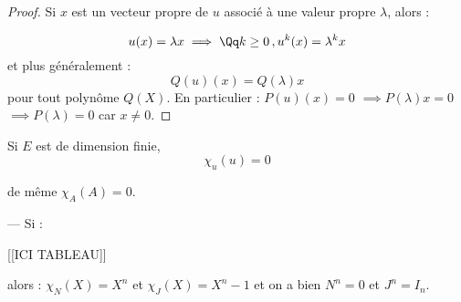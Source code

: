 \documentclass[class=report,crop=false]{standalone}
\begin{document}
\begin{proof}
Si $x$ est un vecteur propre de $u$ associé à une valeur propre $\lambda$, alors :

\[u(x) = \lambda x \implies \Qq k \ge 0\,, u^k(x) = \lambda^k x\]
 et plus généralement :
\[Q(u)(x) = Q(\lambda)x \]
pour tout polynôme $Q(X)$. En particulier : $P(u)(x)=0$ $\implies P(\lambda) x =0$ $\implies P(\lambda) = 0$ car $x \neq 0$.
\end{proof}


\begin{theoreme}
Si $E$ est de dimension finie, \[\chi_u(u) = 0\]

de même $\chi_A(A)  =0$.
\end{theoreme}
\begin{exemple}
--- Si :

[[ICI TABLEAU]]




alors : $\chi_N(X) = X^n$ et $\chi_J(X) = X^n -1$ et on a bien $N^n=0$ et $J^n = I_n$.
\end{exemple}
\end{document}
